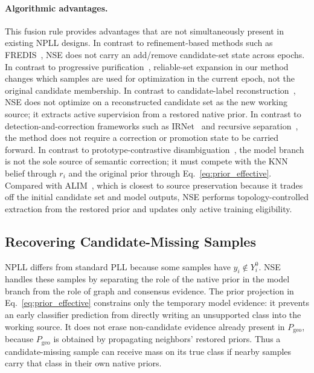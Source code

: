 \paragraph{Algorithmic advantages.}
This fusion rule provides advantages that are not simultaneously present in
existing NPLL designs. In contrast to refinement-based methods such as
FREDIS~\cite{qiao2023fredis}, NSE does not carry an add/remove candidate-set
state across epochs. In contrast to progressive purification~\cite{xu2022pop},
reliable-set expansion in our method changes which samples are used for
optimization in the current epoch, not the original candidate membership. In
contrast to candidate-label reconstruction~\cite{peng2025noise}, NSE does not
optimize on a reconstructed candidate set as the new working source; it extracts
active supervision from a restored native prior. In contrast to
detection-and-correction frameworks such as IRNet~\cite{lian2023irnet} and
recursive separation~\cite{Shi2023Unreliable}, the method does not require a
correction or promotion state to be carried forward. In contrast to
prototype-contrastive disambiguation~\cite{wang2022pico,wang2022pico+}, the
model branch is not the sole source of semantic correction; it must compete with
the KNN belief through $r_i$ and the original prior through
Eq.~\eqref{eq:prior_effective}. Compared with ALIM~\cite{xu2023alim}, which is
closest to source preservation because it trades off the initial candidate set
and model outputs, NSE performs topology-controlled extraction from the restored
prior and updates only active training eligibility.

\subsection{Recovering Candidate-Missing Samples}
\label{sec:missing_label_recovery}
NPLL differs from standard PLL because some samples have $y_i\notin Y_i^0$.
NSE handles these samples by separating the role of the native prior in the
model branch from the role of graph and consensus evidence. The prior projection
in Eq.~\eqref{eq:prior_effective} constrains only the temporary model evidence:
it prevents an early classifier prediction from directly writing an unsupported
class into the working source. It does not erase non-candidate evidence already
present in $P_{\mathrm{geo}}$, because $P_{\mathrm{geo}}$ is obtained by
propagating neighbors' restored priors. Thus a candidate-missing sample can
receive mass on its true class if nearby samples carry that class in their own
native priors.

